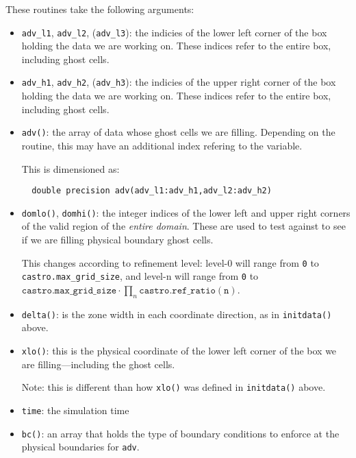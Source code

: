 \begin{itemize}
\begin{itemize}
  \end{itemize}

  These routines take the following arguments:
  \begin{itemize}
  \item {\tt adv\_l1}, {\tt adv\_l2}, ({\tt adv\_l3}): the indicies of
    the lower left corner of the box holding the data we are working on.
    These indices refer to the entire box, including ghost cells.

  \item {\tt adv\_h1}, {\tt adv\_h2}, ({\tt adv\_h3}): the indicies of
    the upper right corner of the box holding the data we are working on.
    These indices refer to the entire box, including ghost cells.

  \item {\tt adv()}: the array of data whose ghost cells we are filling.
    Depending on the routine, this may have an additional index refering
    to the variable.
    
    This is dimensioned as:
\begin{verbatim}
  double precision adv(adv_l1:adv_h1,adv_l2:adv_h2)                             
\end{verbatim}

  \item {\tt domlo()}, {\tt domhi()}: the integer indices of the lower
    left and upper right corners of the valid region of the {\em entire
    domain}.  These are used to test against to see if we are filling
    physical boundary ghost cells.

    This changes according to refinement level: level-0 will
    range from {\tt 0} to {\tt castro.max\_grid\_size},
    and level-n will range from {\tt 0} to
    $\mathtt{castro.max\_grid\_size} \cdot \prod_n \mathtt{castro.ref\_ratio(n)}$.

  \item {\tt delta()}: is the zone width in each coordinate direction,
    as in {\tt initdata()} above.

  \item {\tt xlo()}: this is the physical coordinate of the lower
    left corner of the box we are filling---including the ghost cells.

    Note: this is different than how {\tt xlo()} was defined in
    {\tt initdata()} above.

  \item {\tt time}: the simulation time

  \item {\tt bc()}: an array that holds the type of boundary conditions
    to enforce at the physical boundaries for {\tt adv}.


\end{itemize}
\end{itemize}
